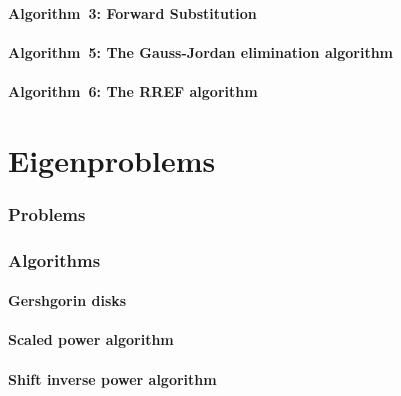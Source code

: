 \documentclass[a4paper]{article}
\newcommand{\labbase}{}
\let\OrigLstInputListing
\renewcommand{}[2][]{\OrigLstInputListing[#1]{\labbase#2}}
\begin{document}
\subsection{Algorithm~3: Forward Substitution}%
\label{algorithm:3}

\subsection{Algorithm~5: The Gauss-Jordan elimination algorithm}%
\label{algorithm:5}

\subsection{Algorithm~6: The RREF algorithm}%
\label{algorithm:6}


\part{Eigenproblems}

\renewcommand{\labbase}{lab2/}

\section{Problems}





\clearpage

\section{Algorithms}
\subsection{Gershgorin disks}%
\label{algorithm:gershgorin}

\subsection{Scaled power algorithm}

\subsection{Shift inverse power algorithm}

\end{document}
